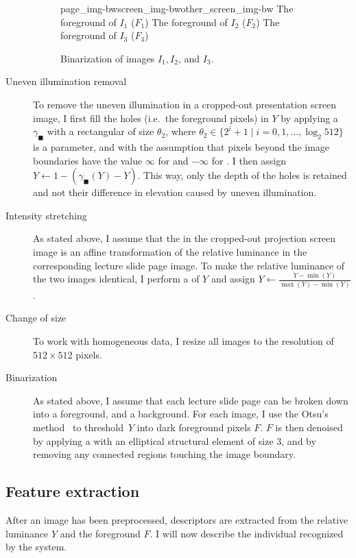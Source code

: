 \begin{description}
\begin{figure}
    \kern\floatsep
      {page_img-bw}{screen_img-bw}{other_screen_img-bw}%
      {The foreground of $I_1$ ($F_1$)}%
      {The foreground of $I_2$ ($F_2$)}%
      {The foreground of $I_3$ ($F_3$)}
    \caption{Binarization of images $I_1,I_2$, and $I_3$.}
    \label{fig:system-preprocessing-last}
  \end{figure}
  \item[Uneven illumination removal]
    To remove the uneven illumination in a cropped-out presentation screen
    image, I first fill the holes (i.e.\ the foreground pixels) in $Y$ by
    applying a  $\gamma_\blacksquare$ with a
    rectangular  of size $\theta_2$, where
    $\theta_2\in\{2^i+1\mid i=0,1,\ldots,\log_2 512\}$
    is a parameter, and with the assumption that pixels beyond the image
    boundaries have the value $\infty$ for  and
    $-\infty$ for . I then assign $Y\leftarrow
    1-(\gamma_\blacksquare(Y)-Y)$.  This way, only the depth of the holes is retained and
    not their difference in elevation caused by uneven illumination.
  \item[Intensity stretching]
    As stated above, I assume that the  in the
    cropped-out projection screen image is an affine transformation of the
    relative luminance in the corresponding lecture slide page image. To make
    the relative luminance of the two images identical, I perform a
     of $Y$ and assign
    $Y\leftarrow\frac{Y-\min(Y)}{\max(Y)-\min(Y)}$.
  \item[Change of size]
    To work with homogeneous data, I resize all images to the resolution of
    $512\times 512$ pixels.
  \item[Binarization]
    As stated above, I assume that each lecture slide page can be broken down
    into a foreground, and a background. For each image, I use
    the Otsu's method~\cite{otsu1979threshold} to threshold~$Y$ into dark
    foreground pixels $F$. $F$ is then denoised by applying a
     with an elliptical
    structural element of size 3, and by removing any connected regions
    touching the image boundary.
\end{description}

\subsection{Feature extraction}
After an image has been preprocessed, descriptors are extracted from the
relative luminance $Y$ and the foreground $F$. I will now describe the
individual  recognized by the system.

